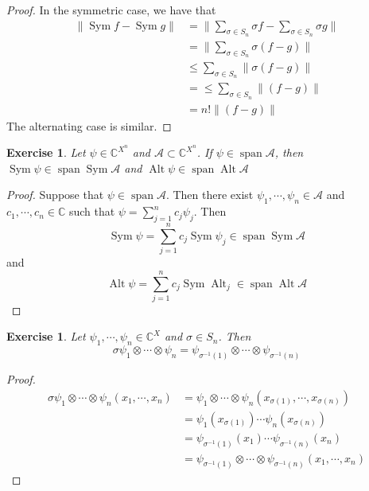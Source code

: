 \documentclass[12pt]{amsart}
\newtheorem{ex}[thm]{Exercise}
\newcommand{\sig}{\sigma}
\newcommand{\C}{\mathbb{C}}
\newcommand{\MA}{\mathcal{A}}
\DeclareMathOperator{\spn}{span}
\DeclareMathOperator{\alt}{Alt}
\DeclareMathOperator{\sym}{Sym}
\begin{document}
\begin{proof}
	In the symmetric case, we have that 
	\begin{align*}
		\| \sym f- \sym g\| 
		&= \bigg \| \sum_{\sig \in S_n} \sig f - \sum_{\sig \in S_n} \sig g \bigg\| \\
		&= \bigg \| \sum_{\sig \in S_n} \sig (f-g)  \bigg \|  \\
		& \leq \sum_{\sig \in S_n} \| \sig (f-g)  \| \\
		&= \leq \sum_{\sig \in S_n} \| (f-g)  \| \\
		&= n! \| (f-g)  \|
	\end{align*}
	The alternating case is similar.
\end{proof}

\begin{ex}
	Let $\psi \in \C^{X^n}$ and  $\MA \subset \C^{X^n}$. If $\psi \in \spn \MA$, then $\sym \psi \in \spn \sym \MA $ and $\alt \psi \in \spn \alt \MA $
\end{ex}

\begin{proof}
	Suppose that $\psi \in \spn \MA$. Then there exist $\psi_1, \cdots, \psi_n \in \MA$ and $c_1, \cdots, c_n \in \C$ such that $\psi = \sum\limits_{j =1}^n c_j \psi_j$. Then $$\sym \psi = \sum\limits_{j =1}^n c_j \sym \psi_j \in \spn \sym \MA$$ and $$\alt \psi = \sum\limits_{j =1}^n c_j \sym \alt_j \in \spn \alt \MA$$ 
\end{proof}


\begin{ex}
	\item Let $\psi_1, \cdots, \psi_n \in \C^{X}$ and $\sig \in S_n$. Then $$ \sig \psi_1 \otimes \cdots \otimes \psi_n = \psi_{\sig^{-1}(1)} \otimes \cdots \otimes \psi_{\sig^{-1}(n)}$$
\end{ex}

\begin{proof}
	\begin{align*}
		\sig \psi_1 \otimes \cdots \otimes \psi_n(x_1, \cdots, x_n) 
		&=  \psi_1 \otimes \cdots \otimes \psi_n(x_{\sig(1)}, \cdots, x_{\sig(n)}) \\
		&= \psi_1(x_{\sig(1)}) \cdots \psi_n(x_{\sig(n)}) \\
		&= \psi_{\sig^{-1}(1)}(x_1) \cdots \psi_{\sig^{-1}(n)}(x_n) \\
		&= \psi_{\sig^{-1}(1)} \otimes \cdots \otimes \psi_{\sig^{-1}(n)}(x_1, \cdots, x_n)
	\end{align*} 
\end{proof}
\end{document}
